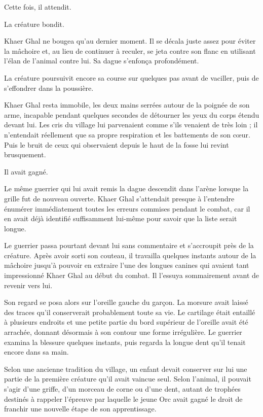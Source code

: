 Cette fois, il attendit.

La créature bondit.

Khaer Ghal ne bougea qu'au dernier moment. Il se décala juste assez pour éviter
la mâchoire et, au lieu de continuer à reculer, se jeta contre son flanc en
utilisant l'élan de l'animal contre lui. Sa dague s'enfonça profondément.

La créature poursuivit encore sa course sur quelques pas avant de vaciller,
puis de s'effondrer dans la poussière.

Khaer Ghal resta immobile, les deux mains serrées autour de la poignée de son
arme, incapable pendant quelques secondes de détourner les yeux du corps étendu
devant lui. Les cris du village lui parvenaient comme s'ils venaient de très
loin ; il n'entendait réellement que sa propre respiration et les battements de
son cœur. Puis le bruit de ceux qui observaient depuis le haut de la fosse lui
revint brusquement.

Il avait gagné.

\scenebreak

Le même guerrier qui lui avait remis la dague descendit dans l'arène lorsque la
grille fut de nouveau ouverte. Khaer Ghal s'attendait presque à l'entendre
énumérer immédiatement toutes les erreurs commises pendant le combat, car il en
avait déjà identifié suffisamment lui-même pour savoir que la liste serait
longue.

Le guerrier passa pourtant devant lui sans commentaire et s'accroupit près de
la créature. Après avoir sorti son couteau, il travailla quelques instants
autour de la mâchoire jusqu'à pouvoir en extraire l'une des longues canines qui
avaient tant impressionné Khaer Ghal au début du combat. Il l'essuya
sommairement avant de revenir vers lui.

Son regard se posa alors sur l'oreille gauche du garçon. La morsure avait
laissé des traces qu'il conserverait probablement toute sa vie. Le cartilage
était entaillé à plusieurs endroits et une petite partie du bord supérieur de
l'oreille avait été arrachée, donnant désormais à son contour une forme
irrégulière. Le guerrier examina la blessure quelques instants, puis regarda la
longue dent qu'il tenait encore dans sa main.

Selon une ancienne tradition du village, un enfant devait conserver sur lui une
partie de la première créature qu'il avait vaincue seul. Selon l'animal, il
pouvait s'agir d'une griffe, d'un morceau de corne ou d'une dent, autant de
trophées destinés à rappeler l'épreuve par laquelle le jeune Orc avait gagné le
droit de franchir une nouvelle étape de son apprentissage.

